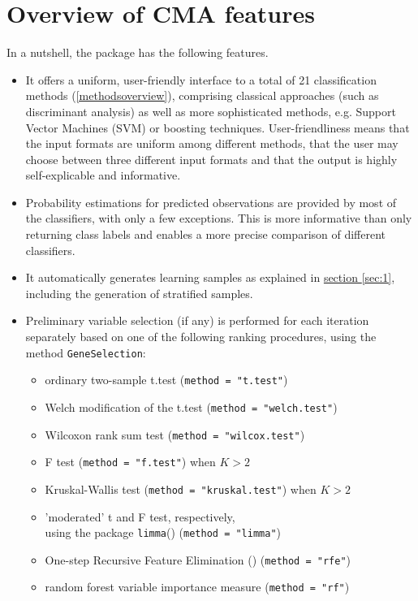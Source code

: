 \section{Overview of CMA features}\label{sec:2}
In a nutshell, the package has the following features.
\begin{itemize}
\item It offers a uniform, user-friendly interface to a total of 21 classification
      methods (\ref{methodsoverview}), comprising classical approaches (such as 
	discriminant analysis)
      as well as more sophisticated methods, e.g. Support Vector Machines (SVM) or
      boosting techniques. User-friendliness means that the input formats are
      uniform among different methods, that the user may choose between
      three different input formats and that the output
      is highly self-explicable and informative.
\item Probability estimations for predicted observations are provided 
      by most of the classifiers, with only a few exceptions. This is more
      informative than only returning class labels and enables a more
      precise comparison of different classifiers.
\item It automatically generates learning samples as explained in
      \hyperref[sec:1]{section }{\ref{sec:1}}, including the generation of stratified samples.
\item Preliminary variable selection (if any) is performed for each iteration 
	separately based on one of the following ranking procedures, using the method 
	\texttt{GeneSelection}:
      \begin{itemize}
      \item ordinary two-sample t.test (\texttt{method = "t.test"})
      \item Welch modification of the t.test (\texttt{method = "welch.test"})
      \item Wilcoxon rank sum test (\texttt{method = "wilcox.test"})
      \item F test (\texttt{method = "f.test"}) when $K>2$
      \item Kruskal-Wallis test (\texttt{method = "kruskal.test"}) when $K>2$
      \item 'moderated' t and F test, respectively, \\
             using the package \texttt{limma}(\citet{limma}) (\texttt{method = "limma"})
      \item One-step Recursive Feature Elimination (\citet{rfe}) (\texttt{method = "rfe"})
      \item random forest variable importance measure (\texttt{method = "rf"})

\end{itemize}
\end{itemize}
